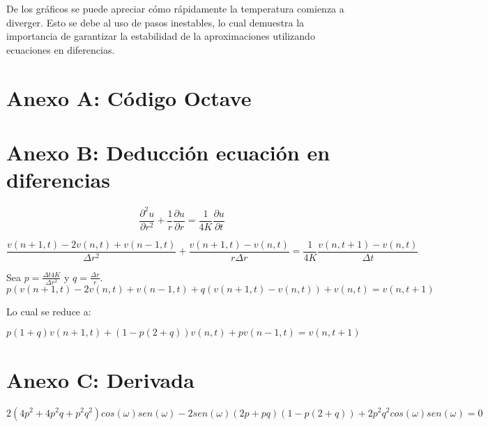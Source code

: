 ﻿\documentclass[%
final,
%
reprint,
%
notitlepage,
narroweqnarray,
inline,
twoside,
invited
]{ieee}
\begin{document}
\par De los gráficos se puede apreciar cómo rápidamente la temperatura comienza a diverger. Esto se debe 
al uso de pasos inestables, lo cual demuestra la importancia de garantizar la estabilidad de la aproximaciones 
utilizando ecuaciones en diferencias.

\begin{thebibliography}{1}



\end{thebibliography}




\clearpage

\onecolumn

\section*{Anexo A: Código Octave}


\section*{Anexo B: Deducción ecuación en diferencias}

\begin{equation}
\frac{\partial^2 u}{\partial r^2}+\frac{1}{r}\frac{\partial u}{\partial r}=\frac{1}{4K}\frac{\partial u}{\partial t}
\end{equation}

\[ \frac{v(n+1,t) - 2v(n,t) + v(n-1,t)}{\Delta r^2} + \frac{v(n+1,t) - v(n,t)}{r\Delta r} = \frac{1}{4K}\frac{v(n,t+1) - v(n,t)}{\Delta t} \]

Sea $p=\frac{\Delta t4K}{\Delta r^2}$ y $q=\frac{\Delta r}{r}$.
\[ p\left( v(n+1,t) - 2v(n,t) + v(n-1,t) + q\left( v(n+1,t) - v(n,t) \right) + v(n,t) = v(n, t+1) \]

Lo cual se reduce a:

\begin{equation}
p(1+q)v(n+1,t) + (1-p(2+q))v(n,t) + pv(n-1,t) = v(n,t+1)
\end{equation}

\section*{Anexo C: Derivada}

\[
2(4p^2+4p^2q+p^2q^2) cos(\omega)sen(\omega) - 2sen(\omega)(2p+pq)(1-p(2+q))+2p^2q^2cos(\omega)sen(\omega) = 0
\]
\end{document}
